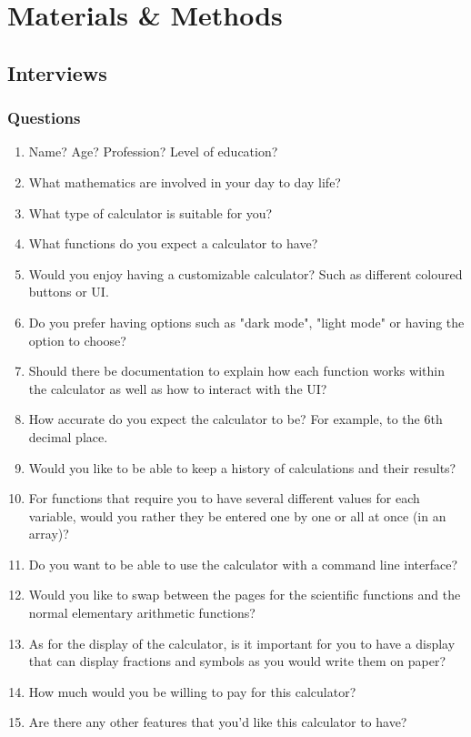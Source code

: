 \section{Materials \& Methods}
    \subsection{Interviews}
        \subsubsection{Questions}
            \begin{enumerate}
                \item Name? Age? Profession? Level of education?
                \item What mathematics are involved in your day to day life?
                \item What type of calculator is suitable for you?
                \item What functions do you expect a calculator to have?
                \item Would you enjoy having a customizable calculator? Such as different coloured buttons or UI.
                \item Do you prefer having options such as "dark mode", "light mode" or having the option to choose?
                \item Should there be documentation to explain how each function works within the calculator as well as how to interact with the UI?
                \item How accurate do you expect the calculator to be? For example, to the 6th decimal place.
                \item Would you like to be able to keep a history of calculations and their results?
                \item For functions that require you to have several different values for each variable, would you rather they be entered one by one or all at once (in an array)?
                \item Do you want to be able to use the calculator with a command line interface?
                \item Would you like to swap between the pages for the scientific functions and the normal elementary arithmetic functions?
                \item As for the display of the calculator, is it important for you to have a display that can display fractions and symbols as you would write them on paper?
                \item How much would you be willing to pay for this calculator?
                \item Are there any other features that you'd like this calculator to have?
            \end{enumerate}

